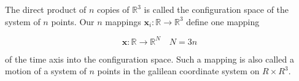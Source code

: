 The direct product of $n$ copies of $\mathbb{R}^3$ is called the configuration space of the system of $n$ points. Our $n$ mappings $\mathbf{x}_i: \mathbb{R} \rightarrow \mathbb{R}^3$ define one mapping

$$\mathbf{x}: \mathbb{R} \rightarrow \mathbb{R}^N \quad N = 3n$$

of the time axis into the configuration space. Such a mapping is also called a motion of a system of $n$ points in the galilean coordinate system on $R \times R^3$.

